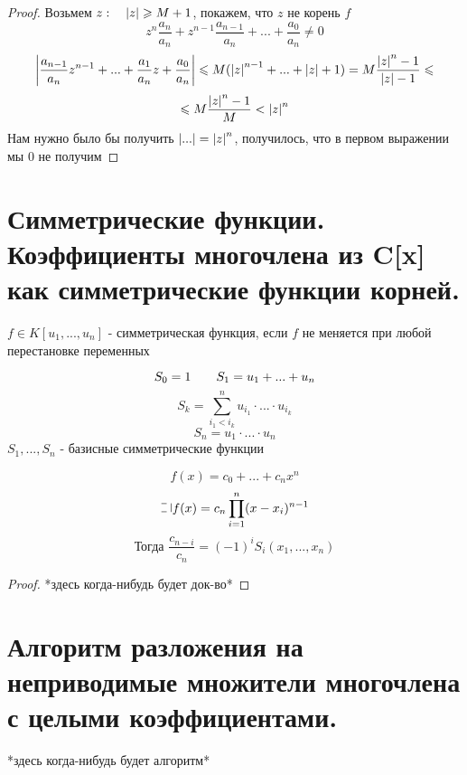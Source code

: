 \documentclass[algebra]{subfiles}
\begin{document}
    \begin{proof}
        Возьмем $z :  \quad \left|z\right| \geqslant M + 1$, покажем, что $z$  не корень $f$
        \[z^n \frac{a_n}{a_n} + z^{n - 1}  \frac{a_{n - 1} }{a_n} + ... + \frac{a_0}{a_n} \neq 0\]
        \[\left|\frac{a_{n - 1} }{a_n} z^{n - 1} + ... + \frac{a_1}{a_n} z  + \frac{a_0}{a_n}\right| \leqslant M(\left|z\right|^{n - 1} + ... + \left|z\right| + 1)
        = M \frac{\left|z\right|^n - 1}{\left|z\right| - 1} \leqslant\]
        \[\leqslant M \frac{\left|z\right|^n - 1}{M} < \left|z\right|^n\]
        Нам нужно было бы получить $\left|...\right| = \left|z\right|^n$, получилось, что в первом выражении мы 0 не получим
    \end{proof}

    \section{Симметрические функции. Коэффициенты многочлена из C[x] как симметрические функции корней.}

    \begin{definition}
        $f \in K[u_1, ..., u_n]$ - симметрическая функция, если $f$ не меняется при любой перестановке переменных
        \begin{Example}
          \[S_0 = 1 \qquad S_1 = u_1 + ... + u_n\]
          \[S_k = \sum_{i_1 < i_k}^n u_{i_1} \cdot ... \cdot u_{i_k}\]
          \[S_n = u_1 \cdot ... \cdot u_n\]
          $S_1,...,S_n$ - базисные симметрические функции
        \end{Example}
    \end{definition}

    \begin{Theorem}[Виета]
      \[f(x) = c_0 + ... + c_n x^n\]
      \[\letus f(x) = c_n \prod_{i=1}^n (x - x_i)^{n-1}\]
      \[\text{Тогда } \frac{c_{n-i}}{c_n} = (-1)^i S_i (x_1,...,x_n)\]
    \end{Theorem}

    \begin{proof}
      *здесь когда-нибудь будет док-во*
    \end{proof}

    \section{Алгоритм разложения на неприводимые множители многочлена с целыми коэффициентами.}

    \begin{alg}
      *здесь когда-нибудь будет алгоритм*
    \end{alg}
\end{document}
